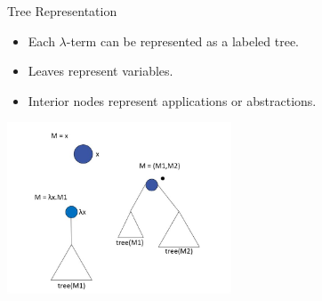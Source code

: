 \documentclass{beamer}
\begin{document}
\begin{frame}{Tree Representation}
    \begin{itemize}
      \item Each $\lambda$-term can be represented as a labeled tree.
      \item Leaves represent variables.
      \item Interior nodes represent applications or abstractions.
    \end{itemize}
    \begin{center}
        \includegraphics[width=0.5\textwidth]{images/treeimage.png}
    \end{center}
\end{frame}
  
\end{document}
